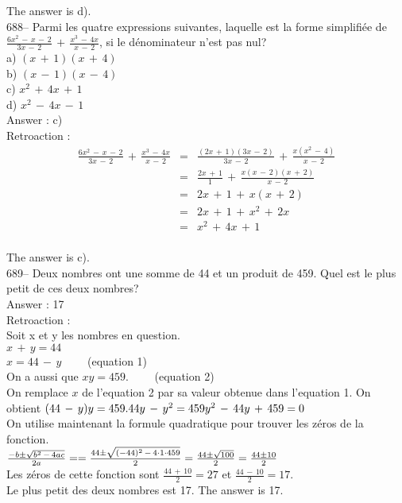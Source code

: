 ﻿\documentclass[letterpaper, 12pt]{article}
\begin{document}
The answer is d).\\

688-- Parmi les quatre expressions suivantes, laquelle est la forme
simplifi\'ee de
$\frac{6x^{2}\,-\,x\,-\,2}{3x\,-\,2}\,+\,\frac{x^{3}\,-\,4x}{x\,-\,2}$, si
le d\'enominateur n'est pas nul?\\
a) $(x\,+\,1)(x\,+\,4)$\\
b) $(x\,-\,1)(x\,-\,4)$\\
c) $x^{2}\,+\,4x\,+\,1$\\
d) $x^{2}\,-\,4x\,-\,1$\\

Answer : c)\\

Retroaction : \\
\begin{eqnarray*}
\frac{6x^{2}\,-\,x\,-\,2}{3x\,-\,2}\,+\,\frac{x^{3}\,-\,4x}{x\,-\,2}&=&\frac{(2x\,+\,1)(3x\,-\,2)}{3x\,-\,2}\,+\,\frac{x(x^{2}\,-\,4)}{x\,-\,2}\\[2mm]
&=&\frac{2x\,+\,1}{1}\,+\,\frac{x(x\,-\,2)(x\,+\,2)}{x\,-\,2}\\[2mm]
&=&2x\,+\,1\,+\,x(x\,+\,2)\\[2mm]
&=&2x\,+\,1\,+\,x^{2}\,+\,2x\\[2mm]
&=&x^{2}\,+\,4x\,+\,1\\
\end{eqnarray*}

The answer is c).\\

689-- Deux nombres ont une somme de 44 et un produit de 459.  Quel est le
plus petit de ces deux nombres?\\

Answer : 17\\

Retroaction : \\
Soit x et y les nombres en question.\\
$x\,+\,y=44$\\
$x=44\,-\,y \qquad$ (equation 1)\\
On a aussi que $xy=459. \qquad$ (equation 2)\\
On remplace $x$ de l'equation 2 par sa valeur obtenue dans l'equation 1.
On obtient $(44\,-\,y)y=459.\\
44y\,-\,y^{2}=459\\
y^{2}\,-\,44y\,+\,459=0$\\

On utilise maintenant la formule quadratique pour trouver les z\'eros de la
fonction.\\[2mm]
$\frac{-b\pm \sqrt{b^{2}\,-\,4ac}}{2a}=\\[2mm]
=\frac{44\pm\sqrt{(-44)^{2}\,-\,4\cdot1\cdot459}}{2}\\[2mm]
=\frac{44\pm \sqrt{100}}{2}\\[2mm]
=\frac{44\pm 10}{2}$\\[2mm]
Les z\'eros de cette fonction sont $\frac{44\,+\,10}{2}=27$ et
$\frac{44\,-\,10}{2}=17$.\\[2mm]
Le plus petit des deux nombres est 17.  The answer is 17.\\
\end{document}
